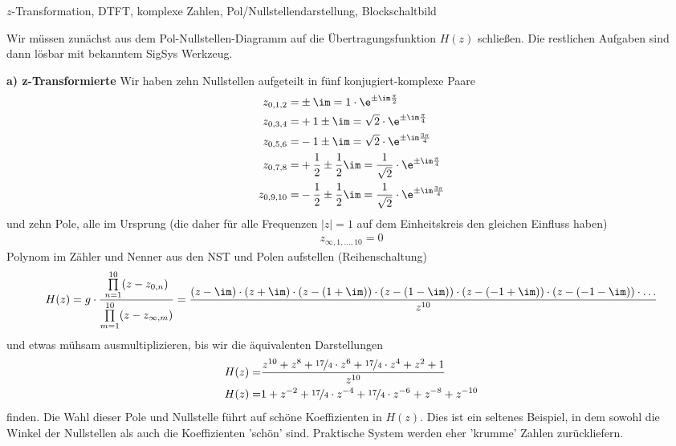 \begin{Werkzeug}
$z$-Transformation, DTFT, komplexe Zahlen, Pol/Nullstellendarstellung, Blockschaltbild
\end{Werkzeug}
\begin{Ansatz}
Wir müssen zunächst aus dem
Pol-Nullstellen-Diagramm auf die Übertragungsfunktion $H(z)$ schließen. Die
restlichen Aufgaben sind dann lösbar mit bekanntem SigSys Werkzeug.
\end{Ansatz}
%
\begin{ExCalc}
%
\textbf{a) z-Transformierte}
%
Wir haben zehn Nullstellen aufgeteilt in fünf konjugiert-komplexe Paare
\begin{align}
z_{0,1,2} =& \pm \im = 1 \cdot \e^{\pm \im \frac{\pi}{2}}\\
z_{0,3,4} =& +1 \pm \im =  \sqrt{2} \cdot \e^{\pm \im \frac{\pi}{4}}\\
z_{0,5,6} =& -1 \pm \im = \sqrt{2} \cdot \e^{\pm \im \frac{3\pi}{4}}\\
z_{0,7,8} =& +\frac{1}{2} \pm \frac{1}{2}\im = \frac{1}{\sqrt{2}} \cdot \e^{\pm \im \frac{\pi}{4}}\\
z_{0,9,10} =& -\frac{1}{2} \pm \frac{1}{2}\im = \frac{1}{\sqrt{2}} \cdot \e^{\pm \im \frac{3\pi}{4}}
\end{align}
und zehn Pole, alle im Ursprung (die daher für alle Frequenzen $|z|=1$ auf dem
Einheitskreis den gleichen Einfluss haben)
\begin{align}
z_{\infty,1,...,10} = 0
\end{align}
Polynom im Zähler und Nenner aus den NST und Polen aufstellen (Reihenschaltung)
\begin{align}
H(z) = g\cdot
\frac
{\prod\limits_{n=1}^{10} (z-z_{0,n})}
{\prod\limits_{m=1}^{10} (z-z_{\infty,m})} =
\frac{
(z-\im)\cdot
(z+\im)\cdot
(z-(1 + \im))\cdot
(z-(1 - \im))\cdot
(z-(-1 + \im))\cdot
(z-(-1 - \im))\cdot
\dots
}{z^{10}}
\end{align}
und etwas mühsam ausmultiplizieren, bis wir die äquivalenten Darstellungen
\begin{align}
H(z) =& \frac{z^{10} + z^8    + \nicefrac{17}{4}\cdot z^6     + \nicefrac{17}{4}\cdot z^4    + z^2    + 1}{z^{10}}\\
H(z) =& 1            + z^{-2} + \nicefrac{17}{4}\cdot z^{-4}  + \nicefrac{17}{4}\cdot z^{-6} + z^{-8} + z^{-10}
\end{align}
finden.
%
Die Wahl dieser Pole und Nullstelle führt auf schöne Koeffizienten in
$H(z)$. Dies ist ein seltenes Beispiel, in dem sowohl die Winkel der Nullstellen
als auch die Koeffizienten 'schön' sind.
%
Praktische System werden eher 'krumme' Zahlen zurückliefern.
%


\end{ExCalc}
